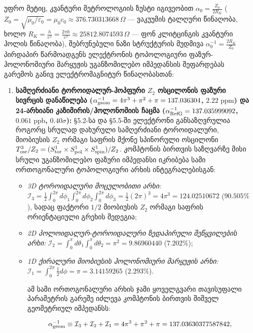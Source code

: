 \documentclass[11pt,a4paper]{article}
\begin{document}
უფრო მეტიც, კვანტური მეტროლოგიის ზუსტი იგივეობით $\alpha_0 = \frac{Z_0}{2 R_K}$ ($Z_0 = \sqrt{\mu_0/\varepsilon_0} = \mu_0 c_0 \approx 376.730313668\,\Omega$ — ვაკუუმის ტალღური წინაღობა, ხოლო $R_K = \frac{h}{e^2} = \frac{2\pi\hbar}{e^2} \approx 25812.8074593\,\Omega$ — ფონ კლიტცინგის კვანტური ჰოლის წინაღობა), შებრუნებული ნაზი სტრუქტურის მუდმივა $\alpha_0^{-1} = \frac{2 R_K}{Z_0}$ პირდაპირ წარმოადგენს ელექტრონის ტოპოლოგიური ფაზურ-ჰოლონომიური მარყუჟის უგანზომილებო იმპედანსის შეფარდებას გარემოს განივ ელექტრომაგნიტურ წინაღობასთან:

\begin{enumerate}[label=\arabic*.]
\item \textbf{სამღერძიანი ტოროიდალურ-ჰოპფური $Z_2$ ოსცილონის ფაზური სივრცის დანაწილება ($\alpha_{\rm geom}^{-1} = 4\pi^3 + \pi^2 + \pi = 137.036304$, $2.22\text{ ppm}$) და 24-არხიანი კაზიმირის/ჰოლონომიის ჩაცმა ($\alpha_{\rm RefG}^{-1} = 137.035999092$, $0.061\text{ ppb}$, $0.40\sigma$):} §5.2-სა და §5.5-ში ელექტრონი განსაზღვრულია როგორც სრულად დახურული სამღერძიანი ტოროიდალური, მიობიუსის $Z_2$ ორმაგი საფრის მქონე სპინორული ოსცილონი $T^3_{\rm osc}/Z_2 = (S^1_{\rm tor}\times S^1_{\rm pol}\times S^1_{\rm spin})/Z_2$. კომპტონის ბირთვის საზღვარზე მისი სრული უგანზომილებო ფაზური იმპედანსი იკრიბება სამი ორთოგონალური ტოპოლოგიური არხის ინტეგრალებისგან:
\begin{itemize}
\item \emph{3D ტოროიდალური მოცულობითი არხი:} $\mathcal{I}_3 = \frac{1}{2}\int_0^{2\pi}d\phi_1\int_0^{2\pi}d\phi_2\int_0^{2\pi}d\phi_3 = \frac{1}{2}(2\pi)^3 = 4\pi^3 = 124.02510672$ ($90.505\%$), სადაც ფაქტორი $1/2$ მიობიუსის $Z_2$ ორმაგი საფრის ორიენტაციული გრეხის შედეგია;
\item \emph{2D პოლოიდალურ-ტოროიდალური ზედაპირული შეწყვილების არხი:} $\mathcal{I}_2 = \int_0^\pi d\theta_1\int_0^\pi d\theta_2 = \pi^2 = 9.86960440$ ($7.202\%$);
\item \emph{1D ქირალური მიობიუსის ჰოლონომიური მარყუჟის არხი:} $\mathcal{I}_1 = \int_0^{2\pi}\frac{1}{2}d\phi = \pi = 3.14159265$ ($2.293\%$).

ამ სამი ორთოგონალური არხის ჯამი ყოველგვარი თავისუფალი პარამეტრის გარეშე იძლევა კომპტონის ბირთვის შიშველ გეომეტრიულ იმპედანსს:

\[
   \alpha_{\rm geom}^{-1} \equiv \mathcal{I}_3 + \mathcal{I}_2 + \mathcal{I}_1 = 4\pi^3 + \pi^2 + \pi = 137.03630377587842,
\]


\end{itemize}
\end{enumerate}
\end{document}

